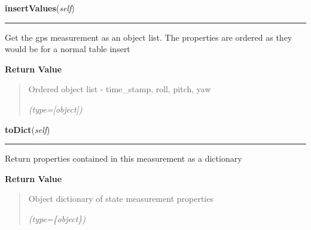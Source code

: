 \hspace{.8\funcindent}\begin{boxedminipage}{\funcwidth}

    \raggedright \textbf{insertValues}(\textit{self})

    \vspace{-1.5ex}

    \rule{\textwidth}{0.5\fboxrule}
\setlength{\parskip}{2ex}
    Get the gps measurement as an object list. The properties are ordered 
    as they would be for a normal table insert

\setlength{\parskip}{1ex}
      \textbf{Return Value}
    \vspace{-1ex}

      \begin{quote}
      Ordered object list - time\_stamp, roll, pitch, yaw

      {\it (type=[object])}

      \end{quote}

    \end{boxedminipage}

    \label{src:dao:model:incoming_state:incoming_state:toDict}

    \vspace{0.5ex}

\hspace{.8\funcindent}\begin{boxedminipage}{\funcwidth}

    \raggedright \textbf{toDict}(\textit{self})

    \vspace{-1.5ex}

    \rule{\textwidth}{0.5\fboxrule}
\setlength{\parskip}{2ex}
    Return properties contained in this measurement as a dictionary

\setlength{\parskip}{1ex}
      \textbf{Return Value}
    \vspace{-1ex}

      \begin{quote}
      Object dictionary of state measurement properties

      {\it (type=\{object\})}

      \end{quote}

    \end{boxedminipage}

